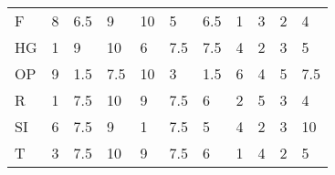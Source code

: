 \documentclass[11pt, a4paper]{article}
\begin{document}
\begin{table}[H]
\begin{tabular}{lllllllllll}
F                             & 8                                        & 6.5                              & 9                                & 10                                 & 5                                 & 6.5                             & 1                                 & 3                                   & 2                                   & 4                                   \\
HG                          & 1                                        & 9                                & 10                               & 6                                  & 7.5                               & 7.5                             & 4                                 & 2                                   & 3                                   & 5                                   \\
OP                       & 9                                        & 1.5                              & 7.5                              & 10                                 & 3                                 & 1.5                             & 6                                 & 4                                   & 5                                   & 7.5                                 \\
R                                & 1                                        & 7.5                              & 10                               & 9                                  & 7.5                               & 6                               & 2                                 & 5                                   & 3                                   & 4                                   \\
SI                        & 6                                        & 7.5                              & 9                                & 1                                  & 7.5                               & 5                               & 4                                 & 2                                   & 3                                   & 10                                  \\
T                              & 3                                        & 7.5                              & 10                               & 9                                  & 7.5                               & 6                               & 1                                 & 4                                   & 2                                   & 5                                   \\

\end{tabular}
\end{table}
\end{document}
